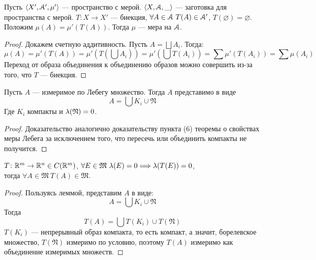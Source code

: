 \begin{lemma}

    Пусть $\langle X', \mathcal{A}', \mu' \rangle$ --- пространство с мерой.
    $\langle X, \mathcal{A}, \_ \rangle$ --- заготовка для пространства с мерой.
    $T \colon X \to X'$ --- биекция, $\forall A \in \mathcal{A}~ T(A) \in \mathcal{A}'$,
    $T(\varnothing) = \varnothing$. Положим $\mu(A) = \mu'(T(A))$. Тогда
    $\mu$ --- мера на $\mathcal{A}$.
\end{lemma}
\begin{proof}
	Докажем счетную аддитивность. Пусть $A = \bigsqcup{A_i}$. Тогда:
\[
	\mu(A) = \mu'(T(A)) = \mu'\left(T\left(\bigcup{A_i}\right)\right) 
	= \mu'\left(\bigcup{T(A_i)}\right) 
	= \sum{\mu'(T(A_i))} = \sum{\mu(A_i)}
\]
	Переход от образа объединения к объединению образов можно совершить из-за 
	того, что $T$ --- биекция.
\end{proof}

\begin{lemma}
	Пусть $A$ --- измеримое по Лебегу множество. Тогда $A$ представимо в виде 
\[
	A = \bigcup{K_i} \cup \mathfrak{N}
\]
	Где $K_i$ компакты и $\lambda(\mathfrak{N}) = 0$.
\end{lemma}
\begin{proof}
	Доказательство аналогично доказательству пункта (6) теоремы о свойствах меры Лебега 
	за исключением того, что пересечь или объединить компакты не получится.
\end{proof}

\begin{lemma}
    $T \colon \mathbb{R}^m \to \mathbb{R}^n \in C(\mathbb{R}^m)$, $\forall E \in \mathfrak{M}~ \lambda(E) = 0
    \Longrightarrow \lambda(T(E)) = 0$, \\ тогда $\forall A \in \mathfrak{M}~ T(A) \in \mathfrak{M}$.
\end{lemma}
\begin{proof}
	Пользуясь леммой, представим $A$ в виде:
\[
	A = \bigcup{K_i} \cup \mathfrak{N}
\]
	Тогда
\[
	T(A) = \bigcup{T(K_i)} \cup T(\mathfrak{N})
\]
	$T(K_i)$ --- непрерывный образ компакта, то есть компакт, а значит, борелевское множество,
	$T(\mathfrak{N})$ измеримо по условию, поэтому $T(A)$ измеримо как объединение измеримых 
	множеств.
\end{proof}

\let\x\undefined
\let\y\undefined
\let\h\undefined
\let\w\undefined
\let\z\undefined
\let\Od\undefined
\let\N\undefined
\let\C\undefined
